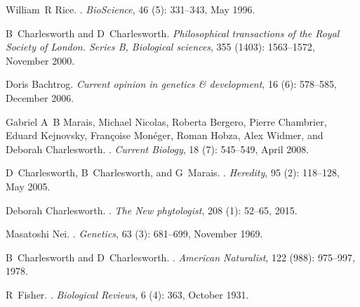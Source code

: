 \begin{thebibliography}{63}
William~R Rice.
.
\newblock \emph{BioScience}, 46 (5): 331--343, May 1996.

B~Charlesworth and D~Charlesworth.
\newblock \emph{Philosophical transactions of the Royal Society of London.
  Series B, Biological sciences}, 355 (1403): 1563--1572,
  November 2000.

Doris Bachtrog.
\newblock \emph{Current opinion in genetics {\&} development}, 16
  (6): 578--585, December 2006.

Gabriel A~B Marais, Michael Nicolas, Roberta Bergero, Pierre Chambrier, Eduard
  Kejnovsky, Fran{\c c}oise Mon{\'e}ger, Roman Hobza, Alex Widmer, and Deborah
  Charlesworth.
.
\newblock \emph{Current Biology}, 18 (7): 545--549, April
  2008.

D~Charlesworth, B~Charlesworth, and G~Marais.
.
\newblock \emph{Heredity}, 95 (2): 118--128, May 2005.

Deborah Charlesworth.
.
\newblock \emph{The New phytologist}, 208 (1): 52--65, 2015.

Masatoshi Nei.
.
\newblock \emph{Genetics}, 63 (3): 681--699, November 1969.

B~Charlesworth and D~Charlesworth.
.
\newblock \emph{American Naturalist}, 122 (988): 975--997,
  1978.

R~Fisher.
.
\newblock \emph{Biological Reviews}, 6 (4): 363, October
  1931.


\end{thebibliography}
